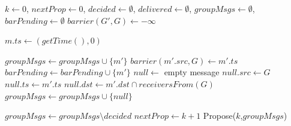 \documentclass[times, 10pt]{article}
\begin{document}
\begin{algorithm}
\begin{distribalgo}[1]

\blankline
{}
  \STATE $k \leftarrow 0$, $nextProp \leftarrow 0$, $decided \leftarrow \emptyset$, $delivered \leftarrow \emptyset$, $groupMsgs \leftarrow \emptyset$, $barPending \leftarrow \emptyset$
    \STATE $barrier(G',G) \leftarrow -\infty$ 
  \ENDINDENT
\ENDINDENT 

\blankline
{}
  \STATE $m.ts \leftarrow (getTime(),0)$
  \STATE {}
\ENDINDENT

\blankline
{}
    \STATE $groupMsgs \leftarrow groupMsgs \cup \{m'\}$
    \STATE $barrier(m'.src,G) \leftarrow m'.ts$ \label{algline:incbar}
      \STATE $barPending \leftarrow barPending \cup \{m'\}$
    \ENDIF
      \STATE $null \leftarrow$ empty message
      \STATE $null.src \leftarrow G$
      \STATE $null.ts \leftarrow m'.ts$ \label{algline:nulltsmts}
      \STATE $null.dst \leftarrow m'.dst \cap receiversFrom(G)$
      \STATE $groupMsgs \leftarrow groupMsgs \cup \{null\}$
    \ENDIF
  \ENDIF
\ENDINDENT

\blankline
{}
    \STATE $groupMsgs \leftarrow groupMsgs \setminus decided$%
    \label{algline:nullstays}
      \STATE $nextProp \leftarrow k + 1$
      \STATE Propose($k$,$groupMsgs$)
    \ENDIF
\ENDINDENT


\end{distribalgo}
\end{algorithm}
\end{document}

